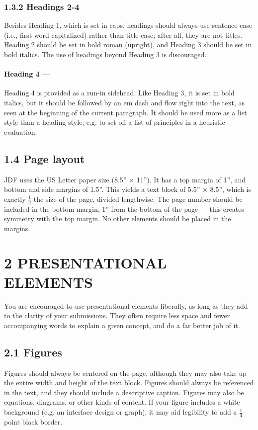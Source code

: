 {{{{\subsubsection*{1.3.2 Headings 2-4}
Besides Heading 1, which is set in caps, headings should always use sentence case (i.e., first word capitalized) rather than title case; after all, they are not titles. Heading 2 should be set in bold roman (upright), and Heading 3 should be set in bold italics. The use of headings beyond Heading 3 is discouraged.

\paragraph*{Heading 4 ---}
Heading 4 is provided as a run-in sidehead. Like Heading 3, it is set in bold italics, but it should be followed by an em dash and flow right into the text, as seen at the beginning of the current paragraph. It should be used more as a list style than a heading style, e.g. to set off a list of principles in a heuristic evaluation.

\subsection*{1.4 Page layout}
JDF uses the US Letter paper size (8.5'' × 11''). It has a top margin of 1'', and bottom and side margins of 1.5''. This yields a text block of 5.5'' × 8.5'', which is exactly $\frac{1}{2}$ the size of the page, divided lengthwise.
The page number should be included in the bottom margin, 1'' from the bottom of the page --- this creates symmetry with the top margin. No other elements should be placed in the margins.

\section*{2 PRESENTATIONAL ELEMENTS}
You are encouraged to use presentational elements liberally, as long as they add to the clarity of your submissions. They often require less space and fewer accompanying words to explain a given concept, and do a far better job of it.

\subsection*{2.1 Figures}
Figures should always be centered on the page, although they may also take up the entire width and height of the text block. Figures should always be referenced in the text, and they should include a descriptive caption. Figures may also be equations, diagrams, or other kinds of content.
If your figure includes a white background (e.g. an interface design or graph), it may aid legibility to add a $\frac{1}{4}$ point black border.

}}}}
